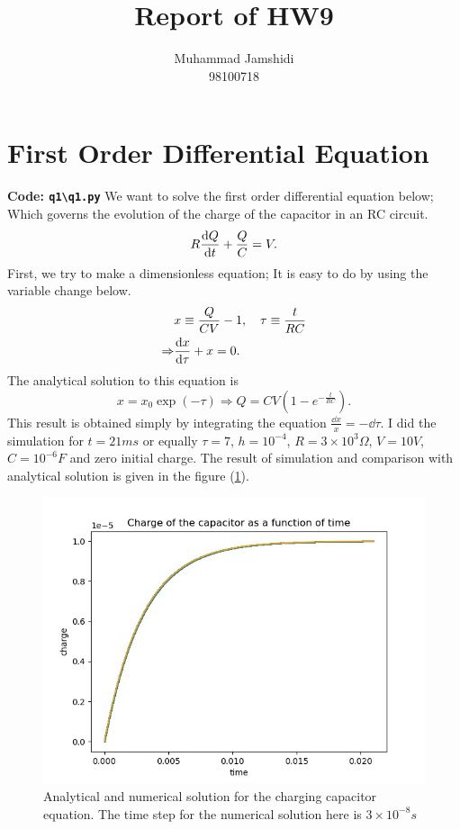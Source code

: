 \documentclass[12pt, a4paper]{article}
\title{Report of HW9}
\author{Muhammad Jamshidi \\ 98100718}
\date{}
\begin{document}
	\maketitle
	\section{First Order Differential Equation}
	\textbf{Code: \texttt{q1\textbackslash q1.py}}
	\newline
	We want to solve the first order differential equation below; Which governs the evolution of the charge of the capacitor in an RC circuit.
	\begin{equation}
		\label{eq:RC_equation}
		R \dv{Q}{t} + \frac{Q}{C} = V.
	\end{equation}
	First, we try to make a dimensionless equation; It is easy to do by using the variable change below.
	\begin{equation} \label{eq: variable_change}
		\begin{aligned}
					&x \equiv \frac{Q}{CV} - 1, \quad \tau \equiv \frac{t}{R C}\\
					\Rightarrow  &\dv{x}{\tau} + x = 0.
		\end{aligned}
	\end{equation}
	The analytical solution to this equation is
	\begin{equation}
		x = x_0 \exp(- \tau) \Rightarrow Q = C V (1 - e^{- \frac{t}{R C}}).
	\end{equation}
	This result is obtained simply by integrating the equation $\frac{\dd{x}}{x} = -\dd{\tau}$.
	I did the simulation for $t = 21 ms$ or equally $\tau = 7$, $h = 10^{-4}$, 
	$R = 3\times10^3 \Omega$, $V = 10 V$, $C = 10^{-6} F$ and zero initial charge. The result of simulation and comparison with analytical solution is given in the figure (\ref{fig:q1_euler}).
		\begin{figure}[h]
			\centering
			\includegraphics[width=0.8\linewidth]{../q1/q1_Euler_result_h=1e-05_tau_stop=7.0.jpg}
			\caption{Analytical and numerical solution for the charging capacitor equation. The time step for the numerical solution here is $3\times10^{-8} s$}
			\label{fig:q1_euler}
		\end{figure}
\end{document}
